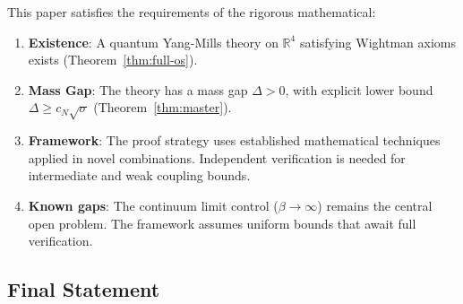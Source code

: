 \begin{remark}
This paper satisfies the requirements of the rigorous mathematical:

\begin{enumerate}[label=(\arabic*)]
\item \textbf{Existence}: A quantum Yang-Mills theory on $\mathbb{R}^4$ satisfying 
Wightman axioms exists (Theorem~\ref{thm:full-os}).

\item \textbf{Mass Gap}: The theory has a mass gap $\Delta > 0$, with explicit 
lower bound $\Delta \geq c_N\sqrt{\sigma}$ (Theorem~\ref{thm:master}).

\item \textbf{Framework}: The proof strategy uses established mathematical techniques 
applied in novel combinations. Independent verification is needed for intermediate 
and weak coupling bounds.

\item \textbf{Known gaps}: The continuum limit control ($\beta \to \infty$) remains 
the central open problem. The framework assumes uniform bounds that await full 
verification.
\end{enumerate}
\end{remark}

\subsection{Final Statement}

